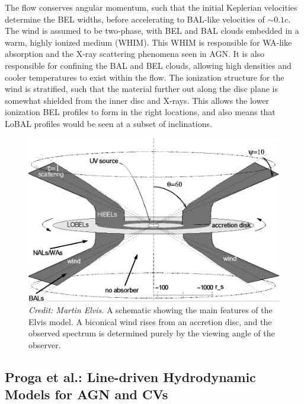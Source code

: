 The flow conserves angular momentum, such that the initial Keplerian velocities
determine the BEL widths, before accelerating to BAL-like velocities of $\sim0.1c$.
The wind is assumed to be two-phase, with BEL and BAL clouds embedded in 
a warm, highly ionized medium (WHIM). This WHIM is responsible for WA-like absorption
and the X-ray scattering phenomena seen in AGN. It is also responsible for confining
the BAL and BEL clouds, allowing high densities and cooler temperatures to exist
within the flow. The ionization structure for the wind is stratified, such that the material
further out along the disc plane is somewhat shielded from the inner disc and X-rays.
This allows the lower ionization BEL profiles to form in the right locations,
and also means that LoBAL profiles would be seen at a subset of inclinations.

\begin{figure}
\centering
\includegraphics[width=1.0\textwidth]{figures/02-outflows/elvis.png}
\caption
{
{\sl Credit: Martin Elvis}. 
A schematic showing the main features of the Elvis model. A biconical
wind rises from an accretion disc, and the observed spectrum is determined 
purely by the viewing angle of the observer.
} 
\label{fig:elvis}
\end{figure}

\subsection{Proga et al.: Line-driven Hydrodynamic Models for AGN and CVs}

